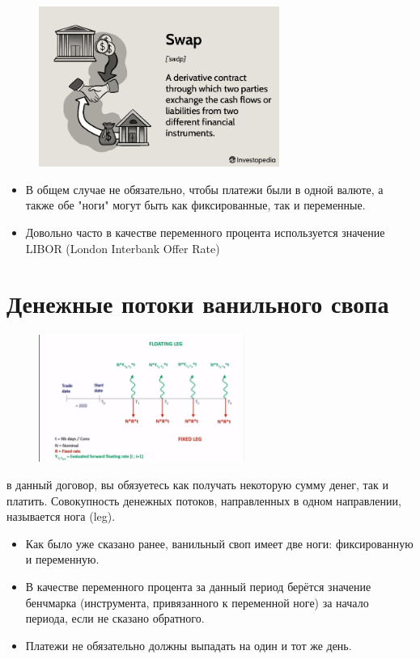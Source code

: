 \documentclass{article}
\begin{document}
\begin{figure}[h]
\centering
\includegraphics[width=0.7\textwidth]{swap definition.png}
\label{loadings}
\end{figure}

\begin{itemize}
     \item В общем случае не обязательно, чтобы платежи были в одной валюте, а также обе "ноги" могут быть как фиксированные, так и переменные.

     \item Довольно часто в качестве переменного процента используется значение LIBOR (London Interbank Offer Rate)
 \end{itemize}


\section{Денежные потоки ванильного свопа}

\begin{figure}[h]
\centering
\includegraphics[width=0.6\textwidth]{swap cash flows.png}
\label{loadings}
\end{figure}

 в данный договор, вы обязуетесь как получать некоторую сумму денег, так и платить. Совокупность денежных потоков, направленных в одном направлении, называется нога (leg). 

\begin{itemize}
    \item Как было уже сказано ранее, ванильный своп имеет две ноги: фиксированную и переменную.

    \item В качестве переменного процента за данный период берётся значение бенчмарка (инструмента, привязанного к переменной ноге) за начало периода, если не сказано обратного.

    \item Платежи не обязательно должны выпадать на один и тот же день.
\end{itemize}
\end{document}
